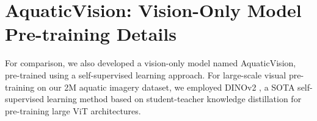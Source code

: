\begin{table}[t!]
    \centering
   \caption{Object counting performance comparison of various SOTA methods on the IOCFish5k test set \cite{sun2023indiscernible}.
AquaticOC achieves the best results, with the lowest Mean Absolute Error (MAE: 13.50) and Mean Squared Error (MSE: 36.10), outperforming other methods.}
    \label{table5}
\end{table}


\section{AquaticVision: Vision-Only Model Pre-training Details}
\label{vision}
For comparison, we also developed a vision-only model named AquaticVision, pre-trained using a self-supervised learning approach. 
For large-scale visual pre-training on our 2M aquatic imagery dataset, we employed DINOv2 \cite{oquab2023dinov2}, a SOTA self-supervised learning method based on student-teacher knowledge distillation for pre-training large ViT architectures.

